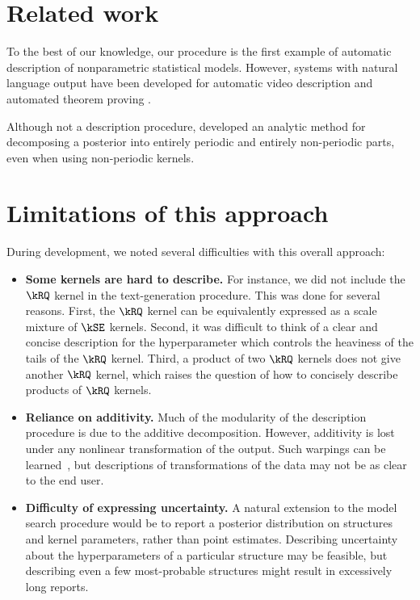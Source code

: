 \section{Related work}
\label{sec:description-related-work}
To the best of our knowledge, our procedure is the first example of automatic description of nonparametric statistical models.
However, systems with natural language output have been developed for automatic video description \citep{barbu2012video} and automated theorem proving \citep{ganesalingam2013fully}.

Although not a description procedure, \citet{durrande2013gaussian} developed an analytic method for decomposing a \gp{} posterior into entirely periodic and entirely non-periodic parts, even when using non-periodic kernels.



\section{Limitations of this approach}

During development, we noted several difficulties with this overall approach:

\begin{itemize}

\item {\bf Some kernels are hard to describe.}
For instance, we did not include the $\kRQ$ kernel in the text-generation procedure.
This was done for several reasons.
First, the $\kRQ$ kernel can be equivalently expressed as a scale mixture of $\kSE$ kernels.
Second, it was difficult to think of a clear and concise description for the hyperparameter which controls the heaviness of the tails of the $\kRQ$ kernel.
Third, a product of two $\kRQ$ kernels does not give another $\kRQ$ kernel, which raises the question of how to concisely describe products of $\kRQ$ kernels.

\item {\bf Reliance on additivity.}
Much of the modularity of the description procedure is due to the additive decomposition.
However, additivity is lost under any nonlinear transformation of the output.
Such warpings can be learned~\citep{snelson2004warped}, but descriptions of transformations of the data may not be as clear to the end user.

\item {\bf Difficulty of expressing uncertainty.}
A natural extension to the model search procedure would be to report a posterior distribution on structures and kernel parameters, rather than point estimates.
Describing uncertainty about the hyperparameters of a particular structure may be feasible,
but describing even a few most-probable structures might result in excessively long reports.

\end{itemize}


